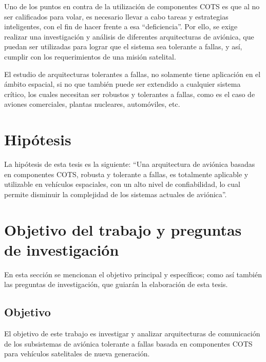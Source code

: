 Uno de los puntos en contra de la utilización de componentes \ac{COTS} es que al no ser calificados para 
volar, es necesario llevar a cabo tareas y estrategias inteligentes, con el fin de hacer frente a 
esa “deficiencia”. Por ello, se exige realizar una investigación y análisis de diferentes 
arquitecturas de aviónica, que puedan ser utilizadas para lograr que el sistema sea tolerante a 
fallas, y así, cumplir con los requerimientos de una misión satelital. 

El estudio de arquitecturas tolerantes a fallas, no solamente tiene aplicación en el ámbito 
espacial, si no que también puede ser extendido a cualquier sistema crítico, los cuales necesitan 
ser robustos y tolerantes a fallas, como es el caso de aviones comerciales, plantas nucleares, 
automóviles, etc.

\section{Hipótesis}
La hipótesis de esta tesis es la siguiente: ``Una arquitectura de aviónica  basadas en componentes 
\ac{COTS}, robusta y tolerante a fallas, es totalmente aplicable y utilizable en vehículos espaciales, 
con un alto nivel de confiabilidad, lo cual permite disminuir la complejidad de los sistemas actuales de aviónica''.

\section{Objetivo del trabajo y preguntas de investigación}
En esta sección se mencionan el objetivo principal y específicos; como así también las preguntas de investigación, que guiarán la elaboración de esta tesis.

\subsection{Objetivo}
El objetivo de este trabajo es investigar y analizar arquitecturas de comunicación de los 
subsistemas de aviónica tolerante a fallas basada en componentes \ac{COTS} para vehículos 
satelitales de nueva generación.

